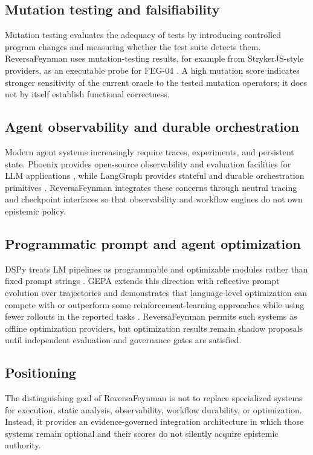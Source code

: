 \subsection{Mutation testing and falsifiability}

Mutation testing evaluates the adequacy of tests by introducing controlled program changes and measuring whether the test suite detects them. ReversaFeynman uses mutation-testing results, for example from StrykerJS-style providers, as an executable probe for FEG-04 \cite{stryker2026}. A high mutation score indicates stronger sensitivity of the current oracle to the tested mutation operators; it does not by itself establish functional correctness.

\subsection{Agent observability and durable orchestration}

Modern agent systems increasingly require traces, experiments, and persistent state. Phoenix provides open-source observability and evaluation facilities for LLM applications \cite{phoenix2026}, while LangGraph provides stateful and durable orchestration primitives \cite{langgraph2026}. ReversaFeynman integrates these concerns through neutral tracing and checkpoint interfaces so that observability and workflow engines do not own epistemic policy.

\subsection{Programmatic prompt and agent optimization}

DSPy treats LM pipelines as programmable and optimizable modules rather than fixed prompt strings \cite{khattab2024dspy}. GEPA extends this direction with reflective prompt evolution over trajectories and demonstrates that language-level optimization can compete with or outperform some reinforcement-learning approaches while using fewer rollouts in the reported tasks \cite{agrawal2026gepa}. ReversaFeynman permits such systems as offline optimization providers, but optimization results remain shadow proposals until independent evaluation and governance gates are satisfied.

\subsection{Positioning}

The distinguishing goal of ReversaFeynman is not to replace specialized systems for execution, static analysis, observability, workflow durability, or optimization. Instead, it provides an evidence-governed integration architecture in which those systems remain optional and their scores do not silently acquire epistemic authority.